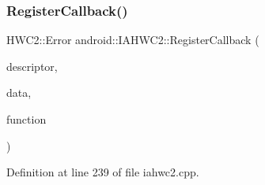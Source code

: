 \subsubsection{\texorpdfstring{Register\+Callback()}{RegisterCallback()}}
{\footnotesize\ttfamily H\+W\+C2\+::\+Error android\+::\+I\+A\+H\+W\+C2\+::\+Register\+Callback (\begin{DoxyParamCaption}\item[{int32\+\_\+t}]{descriptor,  }\item[{hwc2\+\_\+callback\+\_\+data\+\_\+t}]{data,  }\item[{hwc2\+\_\+function\+\_\+pointer\+\_\+t}]{function }\end{DoxyParamCaption})}



Definition at line 239 of file iahwc2.\+cpp.


